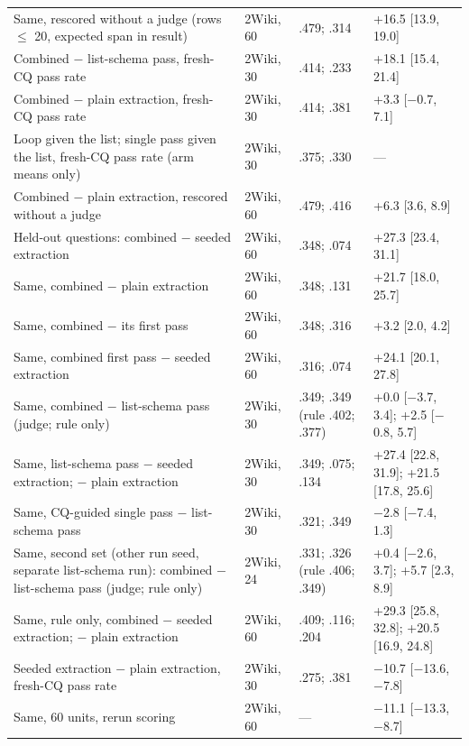 \begin{table}[!ht]
\begin{tabular}{P{7.8cm}P{2.0cm}P{4.2cm}P{3.0cm}}
Same, rescored without a judge (rows $\le$ 20, expected span in result) & 2Wiki, 60 & .479; .314 & +16.5 [13.9, 19.0] \\
Combined $-$ list-schema pass, fresh-CQ pass rate & 2Wiki, 30 & .414; .233 & +18.1 [15.4, 21.4] \\
Combined $-$ plain extraction, fresh-CQ pass rate & 2Wiki, 30 & .414; .381 & +3.3 [$-$0.7, 7.1] \\
Loop given the list; single pass given the list, fresh-CQ pass rate (arm means only) & 2Wiki, 30 & .375; .330 & --- \\
Combined $-$ plain extraction, rescored without a judge & 2Wiki, 60 & .479; .416 & +6.3 [3.6, 8.9] \\
Held-out questions: combined $-$ seeded extraction & 2Wiki, 60 & .348; .074 & +27.3 [23.4, 31.1] \\
Same, combined $-$ plain extraction & 2Wiki, 60 & .348; .131 & +21.7 [18.0, 25.7] \\
Same, combined $-$ its first pass & 2Wiki, 60 & .348; .316 & +3.2 [2.0, 4.2] \\
Same, combined first pass $-$ seeded extraction & 2Wiki, 60 & .316; .074 & +24.1 [20.1, 27.8] \\
Same, combined $-$ list-schema pass (judge; rule only) & 2Wiki, 30 & .349; .349 (rule .402; .377) & +0.0 [$-$3.7, 3.4]; +2.5 [$-$0.8, 5.7] \\
Same, list-schema pass $-$ seeded extraction; $-$ plain extraction & 2Wiki, 30 & .349; .075; .134 & +27.4 [22.8, 31.9]; +21.5 [17.8, 25.6] \\
Same, CQ-guided single pass $-$ list-schema pass & 2Wiki, 30 & .321; .349 & $-$2.8 [$-$7.4, 1.3] \\
Same, second set (other run seed, separate list-schema run): combined $-$ list-schema pass (judge; rule only) & 2Wiki, 24 & .331; .326 (rule .406; .349) & +0.4 [$-$2.6, 3.7]; +5.7 [2.3, 8.9] \\
Same, rule only, combined $-$ seeded extraction; $-$ plain extraction & 2Wiki, 60 & .409; .116; .204 & +29.3 [25.8, 32.8]; +20.5 [16.9, 24.8] \\
Seeded extraction $-$ plain extraction, fresh-CQ pass rate & 2Wiki, 30 & .275; .381 & $-$10.7 [$-$13.6, $-$7.8] \\
Same, 60 units, rerun scoring & 2Wiki, 60 & --- & $-$11.1 [$-$13.3, $-$8.7] \\
\bottomrule
\end{tabular}
\end{table}

